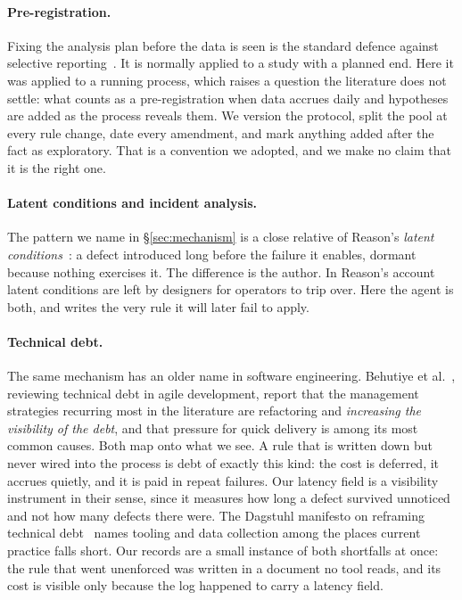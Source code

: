 \documentclass[11pt,a4paper]{article}
\begin{document}
\paragraph{Pre-registration.} Fixing the analysis plan before the data is seen
is the standard defence against selective reporting~\cite{nosek2018prereg}. It
is normally applied to a study with a planned end. Here it was applied to a
running process, which raises a question the literature does not settle: what
counts as a pre-registration when data accrues daily and hypotheses are added
as the process reveals them. We version the protocol, split the pool at every
rule change, date every amendment, and mark anything added after the fact as
exploratory. That is a convention we adopted, and we make no claim that it is
the right one.

\paragraph{Latent conditions and incident analysis.} The pattern we name in
\S\ref{sec:mechanism} is a close relative of Reason's \emph{latent
conditions}~\cite{reason1990}: a defect introduced long before the failure it
enables, dormant because nothing exercises it. The difference is the author.
In Reason's account latent conditions are left by designers for operators to
trip over. Here the agent is both, and writes the very rule it will later fail
to apply.

\paragraph{Technical debt.} The same mechanism has an older name in software
engineering. Behutiye et al.~\cite{behutiye2017td}, reviewing technical debt
in agile development, report that the management strategies recurring most in
the literature are refactoring and \emph{increasing the visibility of the
debt}, and that pressure for quick delivery is among its most common causes.
Both map onto what we see. A rule that is written down but never wired into
the process is debt of exactly this kind: the cost is deferred, it accrues
quietly, and it is paid in repeat failures. Our latency field is a visibility
instrument in their sense, since it measures how long a defect survived
unnoticed and not how many defects there were. The Dagstuhl manifesto on
reframing technical debt~\cite{avgeriou2025reframing} names tooling and data
collection among the places current practice falls short. Our records are a
small instance of both shortfalls at once: the rule that went unenforced was
written in a document no tool reads, and its cost is visible only because the
log happened to carry a latency field.
\end{document}
